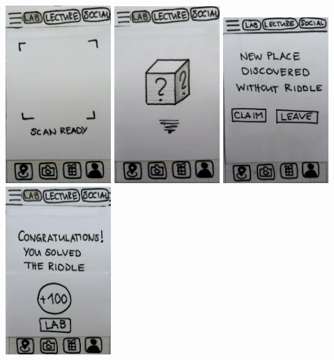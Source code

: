 \documentclass[10pt,twocolumn]{article} %
\begin{document}
\newpage\vspace*{25px}
\includegraphics[width=0.3\textwidth]{./figures/refined_proto/6.jpg}\hfill
\includegraphics[width=0.3\textwidth]{./figures/refined_proto/7.jpg}\hfill
\includegraphics[width=0.3\textwidth]{./figures/refined_proto/8.jpg}\hfill
\vspace*{25px}
\includegraphics[width=0.3\textwidth]{./figures/refined_proto/9.jpg}\hfill
\end{document}
